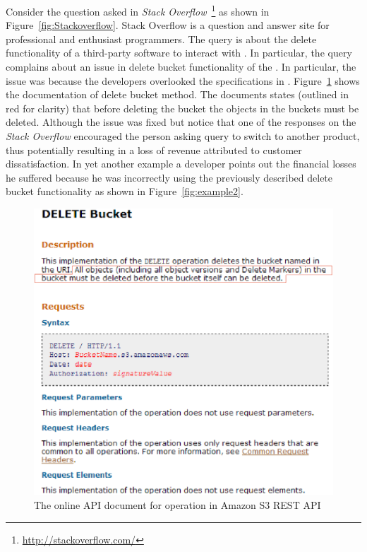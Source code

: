 Consider the question asked in \textit{Stack Overflow}~\footnote{\url{http://stackoverflow.com/}} as shown in Figure~\ref{fig:Stackoverflow}. Stack Overflow is a question and answer site for professional and enthusiast programmers. The query is about the delete functionality of a third-party software  to interact with \amazonAPI. In particular, the query complains about an issue in delete bucket functionality of the . In particular, the issue was because the  developers overlooked the specifications in \amazon. Figure~\ref{fig:AmzonS3DeleteBucketAPI} shows the documentation of delete bucket method. The documents states (outlined in red for clarity) that before deleting the bucket the objects in the buckets must be deleted. Although the issue was fixed but notice that one of the responses on the \textit{Stack Overflow} encouraged the person asking query to switch to another product, thus potentially resulting in a loss of revenue attributed to customer dissatisfaction. In yet another example a developer points out the financial losses he suffered because he was incorrectly using the previously described delete bucket functionality as shown in Figure~\ref{fig:example2}. 


\begin{figure}[t]
\begin{center}
\includegraphics[scale=0.4]{AmzonS3DeleteBucketAPI.eps}
\end{center}
\caption{\label{fig:AmzonS3DeleteBucketAPI} The online API document for  operation in Amazon S3 REST API}
\end{figure}

